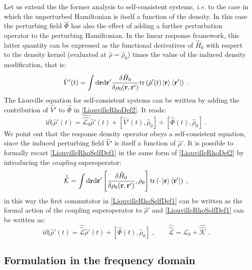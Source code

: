 \documentclass[a4paper]{article}
\renewcommand{\d}{\partial}
\newcommand{\dd}{{\rm d}}
\renewcommand{\r}{{\bf r}}
\newcommand{\ii}{\mathrm{i}}
\newcommand{\be}{\begin{equation}}
\newcommand{\ee}{\end{equation}}
\newcommand{\qq}{\qquad}
\newcommand{\lb}{\label}
\newcommand{\op}[1]{\hat {#1}}
\newcommand{\sop}[1]{\op{\op {#1}}}
\newcommand{\commutator}[2]{\left[ {#1} , {#2} \right]}
\newcommand{\trace}[1]{\mathrm{tr}\left(#1\right)}
\newcommand{\dmnot}{\op{\rho}_0}
\newcommand{\dm}{\op{\rho}}
\newcommand{\hnot}{\op{H}_0}
\newcommand{\Liouv}{\sop{\mathcal L}}
\newcommand{\Liouvnot}{\sop{\mathcal L_0}}
\newcommand{\coupl}{\sop{\mathcal K}}
\begin{document}
Let us extend the the former analysis to self-consistent systems, \emph{i.e.} to the case in which the unperturbed Hamiltonian is itself a function of the density.
In this case the perturbing field $\op\Phi$ has also the effect of adding a further perturbation operator to the perturbing Hamiltonian. In the linear response framework, 
this latter quantity can be expressed as the functional derivatives of $\hnot$ with respect to the density kernel (evaluated at $\dm=\dmnot$) times the value of the
induced density modification, that is:
\be\label{V'tspacedef1}
\op V'(t)= 
\int \dd \r \dd \r' \frac{\delta\hnot}{\delta \rho_0(\r,\r')}
\trace{\dm'(t) \ket{\r} \bra{\r'}} \;.
\ee
The Liouville equation for self-consistent systems can be written by adding the contribution of $\op V'$ to $\op\Phi$ in \eqref{LiouvilleRhoDef2}. 
It reads:
\be\lb{LiouvilleRhoSelfDef1}
\ii \d_t \dm'(t) = \Liouvnot \dm'(t) + \commutator{\op V'(t)}{\dmnot} + \commutator{\op \Phi(t)}{\dmnot} \;.
\ee
We point out that the response density operator obeys a self-consistent equation, since the  induced perturbing field $\op V'$ is itself a function of $\dm'$. 
It is possible to formally recast \eqref{LiouvilleRhoSelfDef1} in the same form of \eqref{LiouvilleRhoDef2} by introducing the \emph{coupling}
superoperator:
\be
\coupl = 
\int \dd \r \dd \r' \commutator{\frac{\delta\hnot}{\delta \rho_0(\r,\r')}}{\dmnot}
\trace{\cdot \ket{\r} \bra{\r'}} \;,
\ee
in this way the first commutator in \eqref{LiouvilleRhoSelfDef1} can be written as the formal action of the coupling superoperator to $\dm'$ and \eqref{LiouvilleRhoSelfDef1}
can be written as:
\be\lb{LiouvilleRhoSelfDef2}
\ii \d_t \dm'(t) = \Liouv \dm'(t) + \commutator{\op \Phi(t)}{\dmnot} \;, \qq
\Liouv = \Liouvnot + \coupl \;.
\ee

\subsection{Formulation in the frequency domain}
\end{document}
